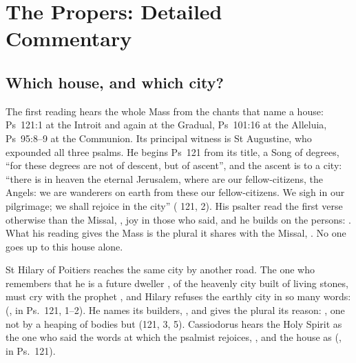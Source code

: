 
\section{The Propers: Detailed Commentary}

\subsection{Which house, and which city?}

The first reading hears the whole Mass from the chants that name a house:
Ps~121:1 at the Introit and again at the Gradual, Ps~101:16 at the Alleluia,
Ps~95:8--9 at the Communion. Its principal witness is St Augustine, who
expounded all three psalms. He begins Ps~121 from its title, a Song of degrees,
``for these degrees are not of descent, but of ascent'', and the ascent is to a
city: ``there is in heaven the eternal Jerusalem, where are our
fellow-citizens, the Angels: we are wanderers on earth from these our
fellow-citizens. We sigh in our pilgrimage; we shall rejoice in the city''
( 121, 2). His psalter read the first verse
otherwise than the Missal, , joy
in those who said, and he builds on the persons: . What his reading gives the Mass is
the plural it shares with the Missal, . No one goes up to this
house alone.

St Hilary of Poitiers reaches the same city by another road. The one who
remembers that he is a future dweller , of the heavenly city built of living stones, must cry with the
prophet , and Hilary refuses the earthly city in so many
words:  (, in Ps.~121, 1--2). He
names its builders, ,
and gives the plural its reason: , one
not by a heaping of bodies but  (121, 3, 5). Cassiodorus hears the Holy Spirit as the one who said the
words at which the psalmist rejoices, , and the house as 
(, in Ps.~121).

